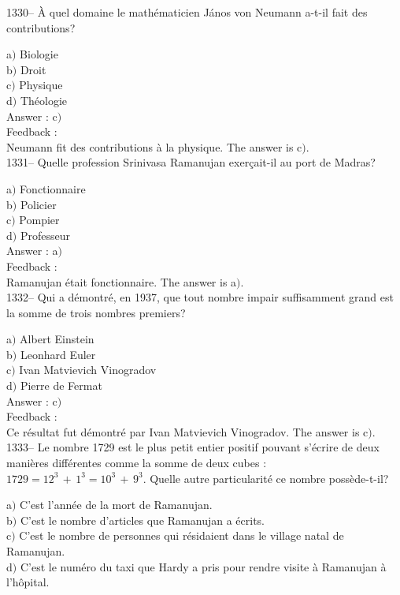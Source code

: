 ﻿\documentclass[letterpaper, 12pt]{article}
\begin{document}
1330-- \`A quel domaine le math\'ematicien J\'anos von Neumann
a-t-il fait des contributions?

a$)$ Biologie \\
b$)$ Droit \\
c$)$ Physique \\
d$)$ Th\'eologie\\

Answer : c$)$\\

Feedback : \\
Neumann fit des contributions \`a la physique.
The answer is  c$)$.\\


1331-- Quelle profession Srinivasa Ramanujan exer\c cait-il au port
de Madras?

a$)$ Fonctionnaire \\
b$)$ Policier \\
c$)$ Pompier \\
d$)$ Professeur\\

Answer : a$)$\\

Feedback : \\
Ramanujan \'etait fonctionnaire.
The answer is  a$)$.\\

1332-- Qui a d\'emontr\'e, en 1937, que tout nombre impair
suffisamment grand est la somme de trois nombres premiers?

a$)$ Albert Einstein \\
b$)$ Leonhard Euler \\
c$)$ Ivan Matvievich Vinogradov \\
d$)$ Pierre de Fermat\\

Answer : c$)$\\

Feedback : \\
Ce r\'esultat fut d\'emontr\'e par Ivan Matvievich Vinogradov.
The answer is  c$)$.\\




1333-- Le nombre 1729 est le plus petit entier positif pouvant
s'\'ecrire de deux mani\`eres diff\'erentes comme la somme de deux
cubes : $1729=12^3\,+\,1^3=10^3\,+\,9^3$. Quelle autre
particularit\'e ce nombre poss\`ede-t-il?

a$)$ C'est l'ann\'ee de la mort de Ramanujan. \\
b$)$ C'est le nombre d'articles que Ramanujan a \'ecrits. \\
c$)$ C'est le nombre de personnes qui r\'esidaient dans le village natal de
Ramanujan. \\
d$)$ C'est le num\'ero du taxi que Hardy a pris pour rendre visite \`a
Ramanujan \`a l'h\^opital.\\
\end{document}

